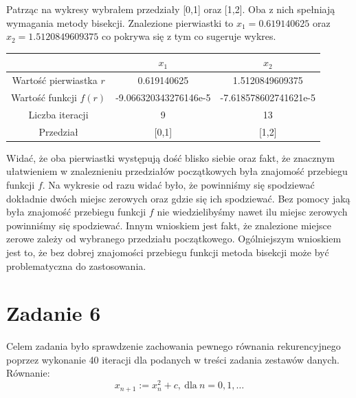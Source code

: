 \documentclass[]{article}
\begin{document}

	Patrząc na wykresy wybrałem przedziały [0,1] oraz [1,2]. Oba z nich spełniają wymagania metody bisekcji. Znalezione pierwiastki to $x_1=0.619140625$ oraz $x_2=1.5120849609375$ co pokrywa się z tym co sugeruje wykres.
	
	
	\begin{table}[!h]
		\centering
		\label{tab:table1}
		\begin{tabular}{c|c|c}
			
			 & $x_1$ & $x_2$ \\ \hline
			Wartość pierwiastka $r$ &  0.619140625 & 1.5120849609375 \\ 
			Wartość funkcji $f(r)$ & -9.066320343276146e-5 & -7.618578602741621e-5  \\ 
			Liczba iteracji & 9 & 13 \\
			Przedział & [0,1] & [1,2] \\
		\end{tabular}
	\end{table}

	Widać, że oba pierwiastki występują dość blisko siebie oraz fakt, że znacznym ułatwieniem w znaleznieniu przedziałów początkowych była znajomość przebiegu funkcji $f$. Na wykresie od razu widać było, że powinniśmy się spodziewać dokładnie dwóch miejsc zerowych oraz gdzie się ich spodziewać. Bez pomocy jaką była znajomość przebiegu funkcji $f$ nie wiedzielibyśmy nawet ilu miejsc zerowych powinniśmy się spodziewać. Innym wnioskiem jest fakt, że znalezione miejsce zerowe zależy od wybranego przedziału początkowego. Ogólniejszym wnioskiem jest to, że bez dobrej znajomości przebiegu funkcji metoda bisekcji może być problematyczna do zastosowania. 

	\clearpage
	
	\section*{Zadanie 6}
	
	Celem zadania było sprawdzenie zachowania pewnego równania rekurencyjnego poprzez wykonanie 40 iteracji dla podanych w treści zadania zestawów danych. Równanie:
	$$x_{n+1} := x^2_n + c, \ \textrm{dla} \ n = 0,1,\dots$$
	
\end{document}
